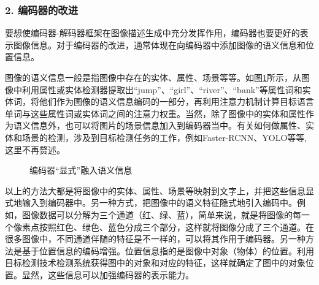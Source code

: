 
\subsubsection{2. 编码器的改进}

\parinterval 要想使编码器-解码器框架在图像描述生成中充分发挥作用，编码器也要更好的表示图像信息。对于编码器的改进，通常体现在向编码器中添加图像的语义信息和位置信息。

\parinterval 图像的语义信息一般是指图像中存在的实体、属性、场景等等。如图\ref{fig:17-17}所示，从图像中利用属性或实体检测器提取出“jump”、“girl”、“river”、“bank”等属性词和实体词，将他们作为图像的语义信息编码的一部分，再利用注意力机制计算目标语言单词与这些属性词或实体词之间的注意力权重。当然，除了图像中的实体和属性作为语义信息外，也可以将图片的场景信息加入到编码器当中。有关如何做属性、实体和场景的检测，涉及到目标检测任务的工作，例如Faster-RCNN、YOLO等等,这里不再赘述。

\begin{figure}[htp]
\centering

\caption{编码器“显式”融入语义信息}
\label{fig:17-17}
\end{figure}

\parinterval 以上的方法大都是将图像中的实体、属性、场景等映射到文字上，并把这些信息显式地输入到编码器中。另一种方式，把图像中的语义特征隐式地引入编码中。例如，图像数据可以分解为三个通道（红、绿、蓝），简单来说，就是将图像的每一个像素点按照红色、绿色、蓝色分成三个部分，这样就将图像分成了三个通道。在很多图像中，不同通道伴随的特征是不一样的，可以将其作用于编码器。另一种方法是基于位置信息的编码增强。位置信息指的是图像中对象（物体）的位置。利用目标检测技术检测系统获得图中的对象和对应的特征，这样就确定了图中的对象位置。显然，这些信息可以加强编码器的表示能力。

